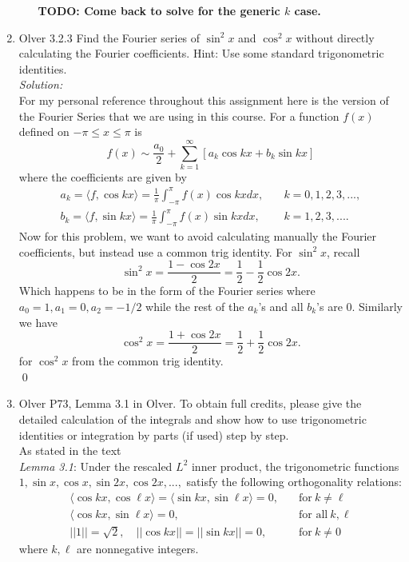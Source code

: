\documentclass[10pt]{amsart}
\theoremstyle{nonumberplain}
\begin{document}
\begin{enumerate}[label={\bf {\arabic*}:}]
\begin{enumerate}
\textbf{TODO: Come back to solve for the generic $k$ case.}

\end{enumerate}
\newpage

\item Olver 3.2.3 Find the Fourier series of $\sin^2 x$ and $\cos^2 x$ without directly calculating the Fourier coefficients.
Hint: Use some standard trigonometric identities.\\

\noindent
\textit{Solution:} \\
For my personal reference throughout this assignment here is the version of the Fourier Series that we are using in this course.
For a function $f(x)$ defined on $-\pi \leq x \leq \pi$ is
$$
f(x) \sim \frac {a_0} 2 + \sum_{k = 1}^\infty \left[ a_k \cos kx + b_k \sin kx \right]
$$
where the coefficients are given by
\begin{align*}
a_k = \langle f, \cos kx \rangle = \frac 1 \pi \int_{-\pi}^\pi f(x) \cos kx dx, \quad &k = 0, 1, 2, 3, ..., \\
b_k = \langle f, \sin kx \rangle = \frac 1 \pi \int_{-\pi}^\pi f(x) \sin kx dx, \quad &k = 1, 2, 3, ....
\end{align*}
Now for this problem, we want to avoid calculating manually the Fourier coefficients, but instead use a common trig identity.
For $\sin^2 x$, recall
$$
\sin^2 x = \frac {1 - \cos 2x} 2 = \frac 1 2 - \frac 1 2 \cos 2x.
$$
Which happens to be in the form of the Fourier series where $a_0 = 1, a_1 = 0, a_2 = -1/2$ while the rest of the $a_k$'s and all $b_k$'s are 0.
Similarly we have
$$
\cos^2 x = \frac {1 + \cos 2x} 2 = \frac 1 2 + \frac 1 2 \cos 2x.
$$
for $\cos^2 x$ from the common trig identity. \\
\qed \\

\newpage

\item Olver P73, Lemma 3.1 in Olver.
To obtain full credits, please give the detailed calculation of the integrals and show how to use trigonometric identities or integration by parts (if used) step by step. \\

\noindent
As stated in the text \\
\textit{Lemma 3.1}: Under the rescaled $L^2$ inner product, the trigonometric functions $1, \sin x, \cos x, \sin 2 x, \cos 2x , ..., $ satisfy the following orthogonality relations:
\begin{align*}
\langle \cos k x, \cos \ell x \rangle = \langle \sin k x, \sin \ell x \rangle = 0, \quad &\text{for}\: k \neq \ell \\
\langle \cos k x, \sin \ell x \rangle = 0, \quad  &\text{for all}\: k, \ell \\
||1|| = \sqrt 2, \quad || \cos k x || = || \sin k x || = 0,  \quad &\text{for}\: k \neq 0
\end{align*}
where $k, \ell$ are nonnegative integers. \\


\end{enumerate}
\end{document}
